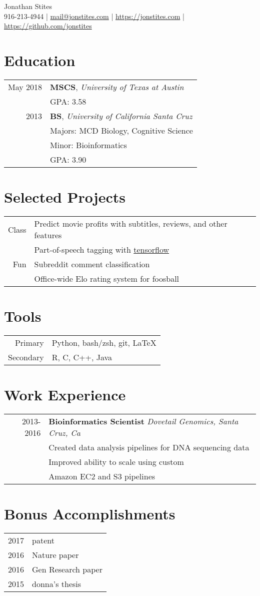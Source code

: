 \documentclass[12pt]{extarticle}
\makeatletter
\newcommand*{\email}{
	\href{mailto:mail+resume@jonstites.com}{mail@jonstites.com}
	}
\newcommand*{\phone}{
	916-213-4944
	}
\newcommand*{\github}{
	{\href{https://github.com/jonstites}{https://github.com/jonstites}}
}
\newcommand*{\website}{
	{\href{https://jonstites.com}{https://jonstites.com}}
}
\makeatother
\begin{document}
\begin{center}
	\Huge Jonathan Stites \\
	\small \phone | \email| \website | \github
\end{center}


\section{Education}
\begin{tabular}{rl}
May 2018  & \textbf{MSCS}, \textit{University of Texas at Austin} \\
          & GPA: 3.58 \\
	2013  & \textbf{BS}, \textit{University of California Santa Cruz} \\
		  & Majors: MCD Biology, Cognitive Science \\
		  & Minor: Bioinformatics \\
		  & GPA: 3.90 \\
\end{tabular}


\section{Selected Projects}
\begin{tabular}{rl}
Class & Predict movie profits with subtitles, reviews, and other features \\
          & Part-of-speech tagging with 
          \href{https://www.tensorflow.org/}{tensorflow} \\
Fun   & Subreddit comment classification \\
		  & Office-wide Elo rating system for foosball \\
\end{tabular}


\section{Tools}
\begin{tabular}{rl}
Primary  & Python, bash/zsh, git, \LaTeX \\
Secondary & R, C, C++, Java \\
\end{tabular}


\section{Work Experience}
\begin{tabular}{rl}
2013-2016 & \textbf{Bioinformatics Scientist} \textit{Dovetail Genomics, Santa Cruz, Ca} \\
& Created data analysis pipelines for DNA sequencing data \\
& Improved ability to scale using custom \\
& Amazon EC2 and S3 pipelines \\
\end{tabular}

\section{Bonus Accomplishments}
\begin{tabular}{rl}
2017 & patent \\
2016 & Nature paper \\
2016 & Gen Research paper \\
2015 & donna's thesis \\
\end{tabular}
\end{document}
